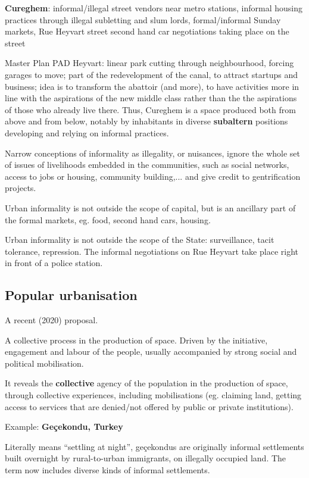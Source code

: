 \documentclass{article}
\begin{document}
\textbf{Cureghem}: informal/illegal street vendors near metro stations, informal housing practices through illegal subletting and slum lords, formal/informal Sunday markets, Rue Heyvart street second hand car negotiations taking place on the street

Master Plan PAD Heyvart: linear park cutting through neighbourhood, forcing garages to move; part of the redevelopment of the canal, to attract startups and business; idea is to transform the abattoir (and more), to have activities more in line with the aspirations of the new middle class rather than the the aspirations of those who already live there. Thus, Cureghem is a space produced both from above and from below, notably by inhabitants in diverse \textbf{subaltern} positions developing and relying on informal practices.

Narrow conceptions of informality as illegality, or nuisances, ignore the whole set of issues of livelihoods embedded in the communities, such as social networks, access to jobs or housing, community building,... and give credit to gentrification projects. 

Urban informality is not outside the scope of capital, but is an ancillary part of the formal markets, eg. food, second hand cars, housing.

Urban informality is not outside the scope of the State: surveillance, tacit tolerance, repression. The informal negotiations on Rue Heyvart take place right in front of a police station.

\subsection{Popular urbanisation}

A recent (2020) proposal.

A collective process in the production of space. Driven by the initiative, engagement and labour of the people, usually accompanied by strong social and political mobilisation.

It reveals the \textbf{collective} agency of the population in the production of space, through collective experiences, including mobilisations (eg. claiming land, getting access to services that are denied/not offered by public or private institutions).

Example: \textbf{Geçekondu, Turkey}

Literally means ``settling at night'', geçekondus are originally informal settlements built overnight by rural-to-urban immigrants, on illegally occupied land. The term now includes diverse kinds of informal settlements.
\end{document}
